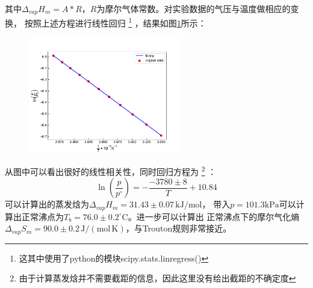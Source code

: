 \documentclass[12pt]{article}
\newcommand{\mr}[1]{\mathrm{#1}}
\def\celsius{^{\circ}\mr{C}}  %
\begin{document}
		其中$\Delta_{vap}H_{m} = A * R$，$R$为摩尔气体常数。对实验数据的气压与温度做相应的变换，
		按照上述方程进行线性回归
		\footnote{这其中使用了python的模块scipy.stats.linregress()}
		，结果如图\ref{P-T of CCl4}所示：
		\begin{figure}[h]
			\centering
			\includegraphics[width=0.6\textwidth]{CCL4.pdf}
			\label{P-T of CCl4}
		\end{figure}
		从图中可以看出很好的线性相关性，同时回归方程为
		\footnote{由于计算蒸发焓并不需要截距的信息，因此这里没有给出截距的不确定度}
		：
		\begin{equation}
			\ln\left(\dfrac{p}{p^{\circ}}\right) = -\dfrac{-3780\pm 8}{T} + 10.84
		\end{equation}
		可以计算出的蒸发焓为$\Delta_{vap}H_{m} = 31.43\pm 0.07\,\mr{kJ/mol}$，
		带入$p = 101.3\mr{kPa}$可以计算出正常沸点为$T_b = 76.0\pm0.2\celsius$。进一步可以计算出
		正常沸点下的摩尔气化熵$\Delta_{vap}S_{m} = 90.0\pm0.2\,\mr{J/(mol\,K)}$，与Trouton规则非常接近。
 		\vbox{}
\end{document}
